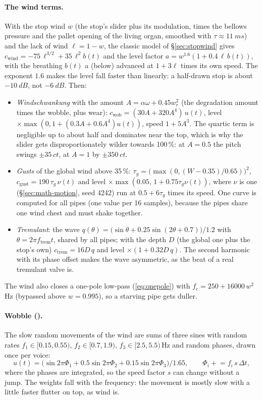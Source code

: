 \paragraph{The wind terms.} With the stop wind $w$ (the stop's  slider plus its modulation, times the
bellows pressure and the pallet opening of the living organ, smoothed with $\tau\approx\SI{11}{ms}$) and the lack of
wind $\ell = 1-w$, the classic model of \S\ref{sec:stopwind} gives
$c_\mathrm{wind} = -75\,\ell^{3/2} + 35\,\ell^2 b(t)$ and the level factor $a = w^{1.6}(1+0.4\,\ell\,b(t))$, with the
breathing $b(t)$ a  (below) advanced at $1+3\ell$ times its own speed. The exponent $1.6$ makes the level
fall faster than linearly: a half-drawn stop is about $\SI{-10}{dB}$, not $\SI{-6}{dB}$. Then:
\begin{itemize}[nosep]
  \item \emph{Windschwankung} with the amount $A = \alpha\omega + 0.45w_r^2$ (the degradation amount times the
    wobble, plus wear): $c_\mathrm{wob} = (30A + 320A^4)\,u(t)$, level $\times\max(0, 1 + (0.3A+0.6A^4)u(t))$, speed
    $1+5A^3$. The quartic term is negligible up to about half and dominates near the top, which is why the slider
    gets disproportionately wilder towards 100\,\%: at $A=0.5$ the pitch swings $\pm\SI{35}{ct}$, at $A=1$ by
    $\pm\SI{350}{ct}$.
  \item \emph{Gusts} of the global wind above 35\,\%: $\tau_g = \bigl(\max(0,(W-0.35)/0.65)\bigr)^2$,
    $c_\mathrm{gust} = 190\,\tau_g\,\nu(t)$ and level $\times\max(0.05,\,1+0.75\tau_g\nu(t))$, where $\nu$ is one
     (\S\ref{sec:math-motion}, seed 4242) run at $0.5+6\tau_g$ times its speed. One curve is
    computed for all pipes (one value per 16 samples), because the pipes share one wind chest and must shake together.
  \item \emph{Tremulant}: the wave $q(\theta) = \bigl(\sin\theta + 0.25\sin(2\theta+0.7)\bigr)/1.2$ with
    $\theta = 2\pi f_\mathrm{trem} t$, shared by all pipes; with the depth $D$ (the global one plus the stop's own)
    $c_\mathrm{trem} = 16D\,q$ and level $\times(1+0.32D\,q)$. The second harmonic with its phase offset makes the
    wave asymmetric, as the beat of a real tremulant valve is.
\end{itemize}
The wind also closes a one-pole low-pass (\ref{eq:onepole}) with $f_c = 250 + 16000\,w^2$\,Hz (bypassed above
$w=0.995$), so a starving pipe gets duller.

\paragraph{Wobble ().} The slow random movements of the wind are sums of three sines with random rates
$f_1\in[0.15,0.55)$, $f_2\in[0.7,1.9)$, $f_3\in[2.5,5.5)$\,Hz and random phases, drawn once per voice:
\begin{equation}
  u(t) = \bigl(\sin 2\pi\Phi_1 + 0.5\sin 2\pi\Phi_2 + 0.15\sin 2\pi\Phi_3\bigr)/1.65,\qquad
  \Phi_i \mathrel{+}= f_i\,s\,\Delta t,
\end{equation}
where the phases are integrated, so the speed factor $s$ can change without a jump. The weights fall with the
frequency: the movement is mostly slow with a little faster flutter on top, as wind is.

